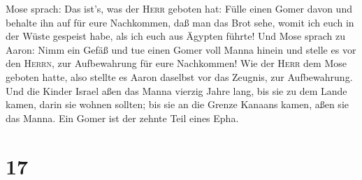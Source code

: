 Mose sprach: Das ist's, was der \textsc{Herr} geboten hat: Fülle einen
Gomer davon und behalte ihn auf für eure Nachkommen, daß man das Brot
sehe, womit ich euch in der Wüste gespeist habe, als ich euch aus
Ägypten führte!  Und Mose sprach zu Aaron: Nimm ein Gefäß
und tue einen Gomer voll Manna hinein und stelle es vor den
\textsc{Herrn}, zur Aufbewahrung für eure Nachkommen! 
Wie der \textsc{Herr} dem Mose geboten hatte, also stellte es Aaron
daselbst vor das Zeugnis, zur Aufbewahrung.  Und die
Kinder Israel aßen das Manna vierzig Jahre lang, bis sie zu dem Lande
kamen, darin sie wohnen sollten; bis sie an die Grenze Kanaans kamen,
aßen sie das Manna.  Ein Gomer ist der zehnte Teil eines
Epha.

\hypertarget{section-16}{%
\section{17}\label{section-16}}

